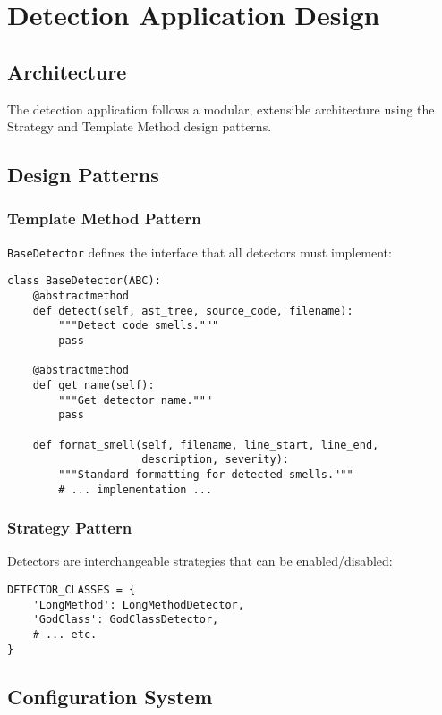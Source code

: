 \documentclass[11pt,a4paper]{article}
\begin{document}
\section{Detection Application Design}

\subsection{Architecture}

The detection application follows a modular, extensible architecture using the Strategy and Template Method design patterns.

\subsection{Design Patterns}

\subsubsection{Template Method Pattern}

\texttt{BaseDetector} defines the interface that all detectors must implement:

\begin{lstlisting}[caption={BaseDetector Interface}]
class BaseDetector(ABC):
    @abstractmethod
    def detect(self, ast_tree, source_code, filename):
        """Detect code smells."""
        pass
    
    @abstractmethod
    def get_name(self):
        """Get detector name."""
        pass
    
    def format_smell(self, filename, line_start, line_end, 
                     description, severity):
        """Standard formatting for detected smells."""
        # ... implementation ...
\end{lstlisting}

\subsubsection{Strategy Pattern}

Detectors are interchangeable strategies that can be enabled/disabled:

\begin{lstlisting}[caption={Detector Strategy}]
DETECTOR_CLASSES = {
    'LongMethod': LongMethodDetector,
    'GodClass': GodClassDetector,
    # ... etc.
}
\end{lstlisting}

\subsection{Configuration System}
\end{document}
